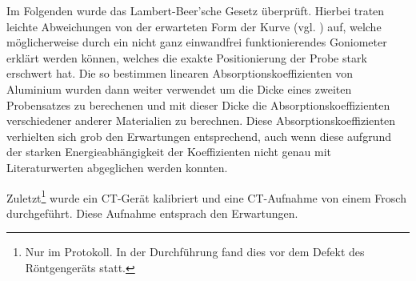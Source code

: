 Im Folgenden wurde das Lambert-Beer'sche Gesetz überprüft. Hierbei traten leichte Abweichungen von der erwarteten Form der Kurve (vgl. ) auf, welche möglicherweise durch ein nicht ganz einwandfrei funktionierendes Goniometer erklärt werden können, welches die exakte Positionierung der Probe stark erschwert hat. Die so bestimmen linearen Absorptionskoeffizienten von Aluminium wurden dann weiter verwendet um die Dicke eines zweiten Probensatzes zu berechenen und mit dieser Dicke die Absorptionskoeffizienten verschiedener anderer Materialien zu berechnen. Diese Absorptionskoeffizienten verhielten sich grob den Erwartungen entsprechend, auch wenn diese aufgrund der starken Energieabhängigkeit der Koeffizienten nicht genau mit Literaturwerten abgeglichen werden konnten.

Zuletzt\footnote{Nur im Protokoll. In der Durchführung fand dies vor dem Defekt des Röntgengeräts statt.} wurde ein CT-Gerät kalibriert und eine CT-Aufnahme von einem Frosch durchgeführt. Diese Aufnahme entsprach den Erwartungen.
